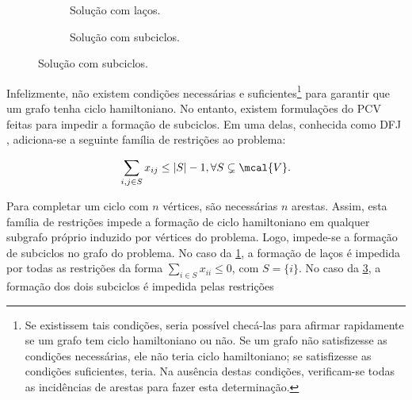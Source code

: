 \begin{figure}[h]
\begin{subfigure}{.4\textwidth}
\centering
{}
\caption{Solução com laços.}\label{fig:PCV laços}
\end{subfigure}
\begin{subfigure}{.4\textwidth}
\centering
{}
\caption{Solução com subciclos.}\label{fig:PCV subciclos}
\end{subfigure}
\end{figure}

Infelizmente, não existem condições necessárias e suficientes\footnote{Se existissem tais condições, seria possível checá-las para afirmar rapidamente se um grafo tem ciclo hamiltoniano ou não. Se um grafo não satisfizesse as condições necessárias, ele não teria ciclo hamiltoniano; se satisfizesse as condições suficientes, teria. Na ausência destas condições, verificam-se todas as incidências de arestas para fazer esta determinação.} para garantir que um grafo tenha ciclo hamiltoniano. No entanto, existem formulações do PCV feitas para impedir a formação de subciclos. Em uma delas, conhecida como DFJ \cite{DANTZIG:54}, adiciona-se a seguinte família de restrições ao problema:

\begin{equation}
    \sum_{i,j \in S}x_{ij} \leq |S| - 1, \forall S \subsetneq \mcal{V}.
\end{equation}

Para completar um ciclo com $n$ vértices, são necessárias $n$ arestas. Assim, esta família de restrições impede a formação de ciclo hamiltoniano em qualquer subgrafo próprio induzido por vértices do problema. Logo, impede-se a formação de subciclos no grafo do problema. No caso da \cref{fig:PCV laços}, a formação de laços é impedida por todas as restrições da forma $\sum_{i\in S}x_{ii} \leq 0$, com $S = \{i\}$. No caso da \cref{fig:PCV subciclos}, a formação dos dois subciclos é impedida pelas restrições

